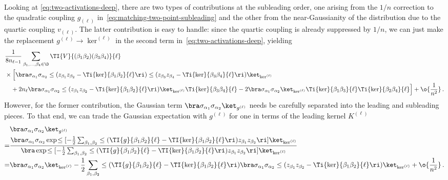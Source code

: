 Looking at \eqref{eq:two-activations-deep}, there are two types of contributions at the subleading order, one arising from the $1/n$ correction to the quadratic coupling $g_{(\ell)}$ in~\eqref{eq:matching-two-point-subleading} and the other from the near-Gaussianity of the distribution due to the quartic coupling $v_{(\ell)}$.
The latter contribution is easy to handle: since the quartic coupling is already suppressed by $1/n$, we can just make the replacement $g^{(\ell)} \to \ker^{(\ell)}$ in the second term in~\eqref{eq:two-activations-deep}, yielding
\begin{align}\label{eq:quartic-easy}
&\frac{1}{8n_{\ell-1}}\sum_{\beta_1,\ldots,\beta_4\in\D}\TI{V}{(\beta_1\beta_2)(\beta_3\beta_4)}{\ell}\, \\
&\times\Big[\bra \sigma_{\alpha_1}\sigma_{\alpha_2} \le(z_{\beta_1} z_{\beta_2}-\Ti{\ker}{\beta_1\beta_2}{\ell}\ri)\le(z_{\beta_3} z_{\beta_4}-\Ti{\ker}{\beta_3\beta_4}{\ell}\ri)\ket_{\ker^{(\ell)}}\, \nonumber\\
&\quad +2n_{\ell} \bra \sigma_{\alpha_1}\sigma_{\alpha_2} \le(z_{\beta_1} z_{\beta_2}-\Ti{\ker}{\beta_1\beta_2}{\ell}\ri)\ket_{\ker^{(\ell)}} \Ti{\ker}{\beta_3\beta_4}{\ell}-2\bra \sigma_{\alpha_1}\sigma_{\alpha_2}\ket_{\ker^{(\ell)}}\Ti{\ker}{\beta_1\beta_3}{\ell}\Ti{\ker}{\beta_2\beta_4}{\ell}\Big]+\o{\frac{1}{n^2}}\, .\nonumber
\end{align}
 However, for the former contribution, the Gaussian term $\bra \sigma_{\alpha_1}\sigma_{\alpha_2}\ket_{g^{(\ell)}}$ needs be carefully separated into the leading and subleading pieces. To that end, we can trade the Gaussian expectation with $g^{(\ell)}$ for one in terms of the leading kernel $K^{(\ell)}$
\begin{align}\label{eq:subleading-sigma-sigma}
&\bra \sigma_{\alpha_1}\sigma_{\alpha_2}\ket_{g^{(\ell)}}\, \\
=&\frac{\bra \sigma_{\alpha_1}\sigma_{\alpha_2} \exp\!\le[-\frac{1}{2}\sum_{\beta_1,\beta_2}\le(\TI{g}{\beta_1\beta_2}{\ell}-\TI{\ker}{\beta_1\beta_2}{\ell}\ri)z_{\beta_1}z_{\beta_2} \ri]\ket_{\ker^{(\ell)}}}{\bra \exp\!\le[-\frac{1}{2}\sum_{\beta_1,\beta_2}\le(\TI{g}{\beta_1\beta_2}{\ell}-\TI{\ker}{\beta_1\beta_2}{\ell}\ri)z_{\beta_1}z_{\beta_2} \ri]\ket_{\ker^{(\ell)}}}\, \nonumber\\
=&\bra \sigma_{\alpha_1}\sigma_{\alpha_2}\ket_{\ker^{(\ell)}}-\frac{1}{2}\sum_{\beta_1,\beta_2}\le(\TI{g}{\beta_1\beta_2}{\ell}-\TI{\ker}{\beta_1\beta_2}{\ell}\ri)\bra \sigma_{\alpha_1}\sigma_{\alpha_2} \le(z_{\beta_1}z_{\beta_2}-\Ti{\ker}{\beta_1\beta_2}{\ell}\ri)\ket_{\ker^{(\ell)}}+\o{\frac{1}{n^2}}\, .\nonumber
\end{align}
